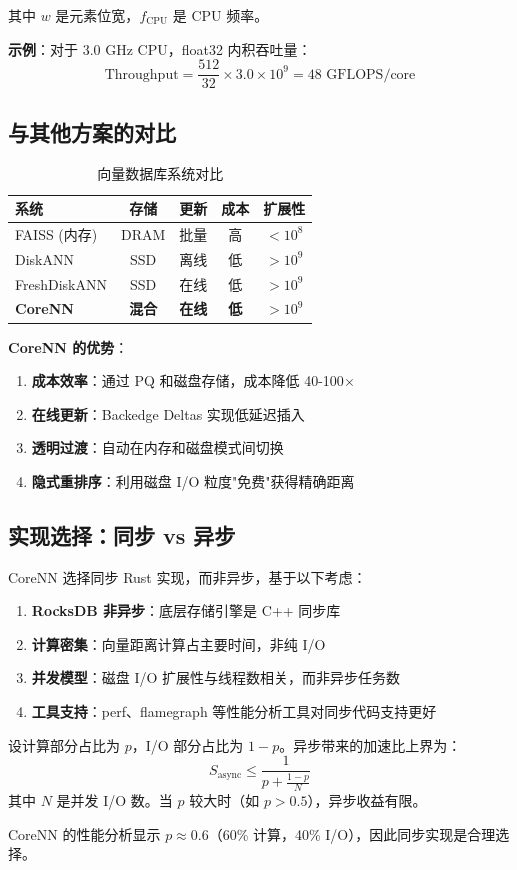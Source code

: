 其中 $w$ 是元素位宽，$f_{\text{CPU}}$ 是 CPU 频率。

\textbf{示例}：对于 3.0 GHz CPU，float32 内积吞吐量：
\begin{equation}
\text{Throughput} = \frac{512}{32} \times 3.0 \times 10^9 = 48 \text{ GFLOPS/core}
\end{equation}

\subsection{与其他方案的对比}

\begin{table}[h]
\centering
\begin{tabular}{@{}lcccc@{}}
\toprule
\textbf{系统} & \textbf{存储} & \textbf{更新} & \textbf{成本} & \textbf{扩展性} \\
\midrule
FAISS (内存) & DRAM & 批量 & 高 & $< 10^8$ \\
DiskANN & SSD & 离线 & 低 & $> 10^9$ \\
FreshDiskANN & SSD & 在线 & 低 & $> 10^9$ \\
\textbf{CoreNN} & \textbf{混合} & \textbf{在线} & \textbf{低} & \textbf{$> 10^9$} \\
\bottomrule
\end{tabular}
\caption{向量数据库系统对比}
\end{table}

\textbf{CoreNN 的优势}：
\begin{enumerate}
    \item \textbf{成本效率}：通过 PQ 和磁盘存储，成本降低 40-100$\times$
    \item \textbf{在线更新}：Backedge Deltas 实现低延迟插入
    \item \textbf{透明过渡}：自动在内存和磁盘模式间切换
    \item \textbf{隐式重排序}：利用磁盘 I/O 粒度"免费"获得精确距离
\end{enumerate}

\subsection{实现选择：同步 vs 异步}

CoreNN 选择同步 Rust 实现，而非异步，基于以下考虑：

\begin{enumerate}
    \item \textbf{RocksDB 非异步}：底层存储引擎是 C++ 同步库
    \item \textbf{计算密集}：向量距离计算占主要时间，非纯 I/O
    \item \textbf{并发模型}：磁盘 I/O 扩展性与线程数相关，而非异步任务数
    \item \textbf{工具支持}：perf、flamegraph 等性能分析工具对同步代码支持更好
\end{enumerate}

\begin{theorem}
设计算部分占比为 $p$，I/O 部分占比为 $1-p$。异步带来的加速比上界为：
\begin{equation}
S_{\text{async}} \leq \frac{1}{p + \frac{1-p}{N}}
\end{equation}
其中 $N$ 是并发 I/O 数。当 $p$ 较大时（如 $p > 0.5$），异步收益有限。
\end{theorem}

CoreNN 的性能分析显示 $p \approx 0.6$（60\% 计算，40\% I/O），因此同步实现是合理选择。
